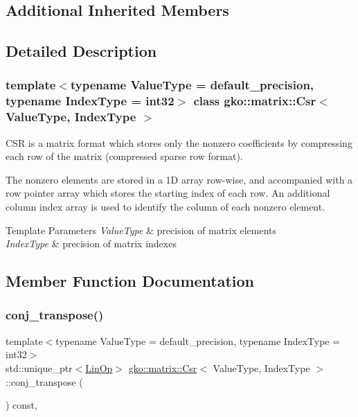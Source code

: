 \subsection*{Additional Inherited Members}


\subsection{Detailed Description}
\subsubsection*{template$<$typename Value\+Type = default\+\_\+precision, typename Index\+Type = int32$>$\newline
class gko\+::matrix\+::\+Csr$<$ Value\+Type, Index\+Type $>$}

C\+SR is a matrix format which stores only the nonzero coefficients by compressing each row of the matrix (compressed sparse row format). 

The nonzero elements are stored in a 1D array row-\/wise, and accompanied with a row pointer array which stores the starting index of each row. An additional column index array is used to identify the column of each nonzero element.


\begin{DoxyTemplParams}{Template Parameters}
{\em Value\+Type} & precision of matrix elements \\
\hline
{\em Index\+Type} & precision of matrix indexes \\
\hline
\end{DoxyTemplParams}


\subsection{Member Function Documentation}
\mbox{\label{classgko_1_1matrix_1_1Csr_a38820451af5424f18b767667f3067d72}} 
\subsubsection{\texorpdfstring{conj\+\_\+transpose()}{conj\_transpose()}}
{\footnotesize\ttfamily template$<$typename Value\+Type = default\+\_\+precision, typename Index\+Type = int32$>$ \\
std\+::unique\+\_\+ptr$<$\hyperlink{classgko_1_1LinOp}{Lin\+Op}$>$ \hyperlink{classgko_1_1matrix_1_1Csr}{gko\+::matrix\+::\+Csr}$<$ Value\+Type, Index\+Type $>$\+::conj\+\_\+transpose (\begin{DoxyParamCaption}{ }\end{DoxyParamCaption}) const\hspace{0.3cm}{\ttfamily [override]}, {\ttfamily [virtual]}}



